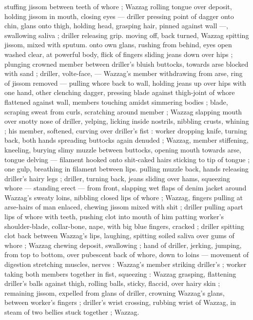 stuffing jissom between teeth of whore ; Wazzag rolling tongue over 
deposit, holding jissom in mouth, closing eyes --- driller pressing 
point of dagger onto chin, glans onto thigh, holding head, grasping 
hair, pinned against wall ---, swallowing saliva ; driller releasing grip. 
moving off, back turned, Wazzag spitting jissom, mixed with sputum. 
onto own glans, rushing from behind, eyes open washed clear, at 
powerful body, flick of fingers sliding jeans down over hips ; plunging 
crowned member between driller's bluish buttocks, towards arse 
blocked with sand ; driller, volte-face, --- Wazzag's member 
withdrawing from arse, ring of jissom removed --- pulling whore back 
to wall, holding jeans up over hips with one hand, other clenching 
dagger, pressing blade against thigh-joint of whore flattened against 
wall, members touching amidst simmering bodies ; blade, scraping 
sweat from curls, scratching around member ; Wazzag slapping 
mouth over snotty nose of driller, yelping, licking inside nostrils, 
nibbling crusts, whining ; his member, softened, curving over driller's 
fist : worker dropping knife, turning back, both hands spreading 
buttocks again denuded ; Wazzag, member stiffening, kneeling, 
burying slimy muzzle between buttocks, opening mouth towards 
arse, tongue delving --- filament hooked onto shit-caked hairs 
sticking to tip of tongue ; one gulp, breathing in filament between 
lips. pulling muzzle back, hands releasing driller's hairy legs ; driller, 
turning back, jeans sliding over hams, squeezing whore --- standing 
erect --- from front, slapping wet flaps of denim jacket around 
Wazzag's sweaty loins, nibbling closed lips of whore ; Wazzag, 
fingers pulling at arse-hairs of man enlaced, chewing jissom mixed 
with shit ; driller pulling apart lips of whore with teeth, pushing clot 
into mouth of him patting worker's shoulder-blade, collar-bone, 
nape, with big blue fingers, cracked ; driller spitting clot back 
between Wazzag's lips, laughing, spitting soiled saliva over gums of 
whore ; Wazzag chewing deposit, swallowing ; hand of driller, jerking, 
jumping, from top to bottom, over pubescent back of whore, down to 
loins --- movement of digestion stretching muscles, nerves : 
Wazzag's member striking driller's ; worker taking both members 
together in fist, squeezing : Wazzag grasping, flattening driller's 
balls against thigh, rolling balls, sticky, flaccid, over hairy skin ; 
remaining jissom, expelled from glans of driller, crowning Wazzag's 
glans, between worker's fingers ; driller's wrist crossing, rubbing 
wrist of Wazzag, in steam of two bellies stuck together ; Wazzag. 
